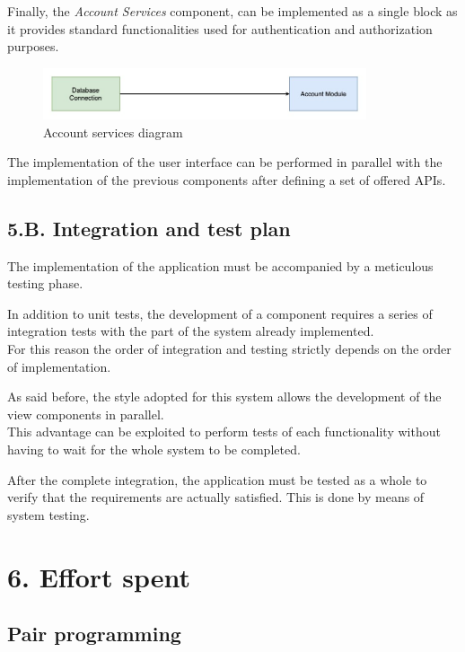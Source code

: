 Finally, the \emph{Account Services} component, can be implemented as a single block as it provides standard functionalities used for authentication and authorization purposes.

\begin{figure}[H]
\centering
\includegraphics[width=0.85\textwidth]{implementation_diagrams/account_services_diagram}
\caption{Account services diagram}
\end{figure}

The implementation of the user interface can be performed in parallel with the implementation of the previous components after defining a set of offered APIs.

\section{5.B. Integration and test plan}

The implementation of the application must be accompanied by a meticulous testing phase.

In addition to unit tests, the development of a component requires a series of integration tests with the part of the system already implemented.\\
For this reason the order of integration and testing strictly depends on the order of implementation.

As said before, the style adopted for this system allows the development of the view components in parallel.\\
This advantage can be exploited to perform tests of each functionality without having to wait for the whole system to be completed.

After the complete integration, the application must be tested as a whole to verify that the requirements are actually satisfied. This is done by means of system testing.

\chapter{6. Effort spent}

\section{Pair programming}

